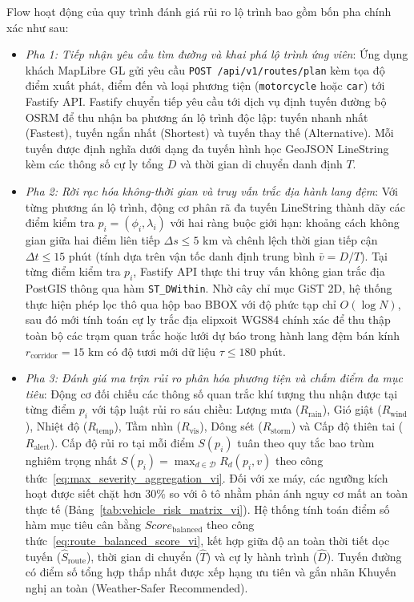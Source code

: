 Flow hoạt động của quy trình đánh giá rủi ro lộ trình bao gồm bốn pha chính xác như sau:
\begin{itemize}
    \item[-] \textit{Pha 1: Tiếp nhận yêu cầu tìm đường và khai phá lộ trình ứng viên}:
    Ứng dụng khách MapLibre GL gửi yêu cầu \texttt{POST /api/v1/routes/plan} kèm tọa độ điểm xuất phát, điểm đến và loại phương tiện (\texttt{motorcycle} hoặc \texttt{car}) tới Fastify API. Fastify chuyển tiếp yêu cầu tới dịch vụ định tuyến đường bộ OSRM để thu nhận ba phương án lộ trình độc lập: tuyến nhanh nhất (Fastest), tuyến ngắn nhất (Shortest) và tuyến thay thế (Alternative). Mỗi tuyến được định nghĩa dưới dạng đa tuyến hình học GeoJSON LineString kèm các thông số cự ly tổng $D$ và thời gian di chuyển danh định $T$.
    \item[-] \textit{Pha 2: Rời rạc hóa không-thời gian và truy vấn trắc địa hành lang đệm}:
    Với từng phương án lộ trình, động cơ phân rã đa tuyến LineString thành dãy các điểm kiểm tra $p_i = (\phi_i, \lambda_i)$ với hai ràng buộc giới hạn: khoảng cách không gian giữa hai điểm liên tiếp $\Delta s \le 5\text{ km}$ và chênh lệch thời gian tiếp cận $\Delta t \le 15\text{ phút}$ (tính dựa trên vận tốc danh định trung bình $\bar{v} = D / T$).
    Tại từng điểm kiểm tra $p_i$, Fastify API thực thi truy vấn không gian trắc địa PostGIS thông qua hàm \texttt{ST\_DWithin}. Nhờ cây chỉ mục GiST 2D, hệ thống thực hiện phép lọc thô qua hộp bao BBOX với độ phức tạp chỉ $O(\log N)$, sau đó mới tính toán cự ly trắc địa elipxoit WGS84 chính xác để thu thập toàn bộ các trạm quan trắc hoặc lưới dự báo trong hành lang đệm bán kính $r_{\text{corridor}} = 15\text{ km}$ có độ tươi mới dữ liệu $\tau \le 180\text{ phút}$.
    \item[-] \textit{Pha 3: Đánh giá ma trận rủi ro phân hóa phương tiện và chấm điểm đa mục tiêu}:
    Động cơ đối chiếu các thông số quan trắc khí tượng thu nhận được tại từng điểm $p_i$ với tập luật rủi ro sáu chiều: Lượng mưa ($R_{\text{rain}}$), Gió giật ($R_{\text{wind}}$), Nhiệt độ ($R_{\text{temp}}$), Tầm nhìn ($R_{\text{vis}}$), Dông sét ($R_{\text{storm}}$) và Cấp độ thiên tai ($R_{\text{alert}}$). Cấp độ rủi ro tại mỗi điểm $S(p_i)$ tuân theo quy tắc bao trùm nghiêm trọng nhất $S(p_i) = \max_{d \in \mathcal{D}} R_d(p_i, v)$ theo công thức~\eqref{eq:max_severity_aggregation_vi}. Đối với xe máy, các ngưỡng kích hoạt được siết chặt hơn 30\% so với ô tô nhằm phản ánh nguy cơ mất an toàn thực tế (Bảng~\ref{tab:vehicle_risk_matrix_vi}).
    Hệ thống tính toán điểm số hàm mục tiêu cân bằng $Score_{\text{balanced}}$ theo công thức~\eqref{eq:route_balanced_score_vi}, kết hợp giữa độ an toàn thời tiết dọc tuyến ($\hat{S}_{\text{route}}$), thời gian di chuyển ($\hat{T}$) và cự ly hành trình ($\hat{D}$). Tuyến đường có điểm số tổng hợp thấp nhất được xếp hạng ưu tiên và gắn nhãn Khuyến nghị an toàn (Weather-Safer Recommended).

\end{itemize}
